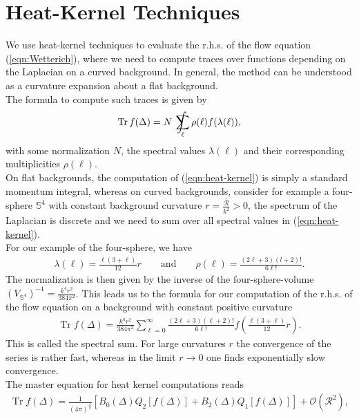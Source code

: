  \section{Heat-Kernel Techniques}\label{sec:heat-kernel}
We use heat-kernel techniques to evaluate the r.h.s. of the flow equation (\ref{eqn:Wetterich}), where we need to compute traces over functions depending on the Laplacian on a curved background. In general, the method can be understood as a curvature expansion about a flat background. \\
The formula to compute such traces is given by
\begin{align}
	\operatorname{Tr} f(\Delta)= N \  \int\kern-1.3em\sum_{\ell} \rho(\ell) f(\lambda(\ell)),
	\label{eqn:heat-kernel}
\end{align}
with some normalization $N$, the spectral values $\lambda(\ell)$ and their corresponding multiplicities $\rho(\ell)$. \\
On flat backgrounds, the computation of (\ref{eqn:heat-kernel}) is simply a standard momentum integral, whereas on curved backgrounds, consider for example a four-sphere $\mathbb{S}^4$ with constant background curvature $r = \frac{\bar{\mathcal{R}}}{k^2} > 0$, the spectrum of the Laplacian is discrete and we need to sum over all spectral values in (\ref{eqn:heat-kernel}). \\
For our example of the four-sphere, we have
\begin{align}
	\lambda(\ell) = \frac{\ell(3+\ell)}{12}r \qquad \text{and} \qquad \rho(\ell) = \frac{(2\ell + 3)(l+2)!}{6\ell!}.
\end{align}
The normalization is then given by the inverse of the four-sphere-volume $ \left(V_{\mathbb{S}^4}\right)^{-1} = \frac{k^4r^2}{384\pi^2}$. This leads us to the formula for our computation of the r.h.s. of the flow equation on a background with constant positive curvature
\begin{align}
\operatorname{Tr} f(\Delta)=\frac{k^{4} r^{2}}{384 \pi^{2}} \sum_{\ell=0}^{\infty} \frac{(2 \ell+3)(\ell+2) !}{6 \ell !} f\left(\frac{\ell(3+\ell)}{12} r\right).
\end{align}
This is called the spectral sum. For large curvatures $r$ the convergence of the series is rather fast, whereas in the limit $r\rightarrow 0$ one finds exponentially slow convergence.\\
The master equation for heat kernel computations reads
\begin{align}
	\operatorname{Tr} f(\Delta)=\frac{1}{(4 \pi)^{\frac{d}{2}}}\left[B_{0}(\Delta) Q_{2}[f(\Delta)]+B_{2}(\Delta) Q_{1}[f(\Delta)]\right]+\mathcal{O}\left(\mathcal{R}^{2}\right),
\end{align}
